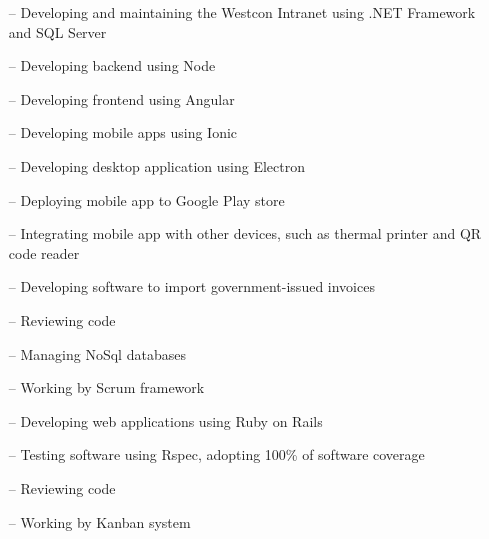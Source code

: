 \documentclass[12pt,a4paper]{altacv}
\begin{document}
\medskip


\begin{itemize}
    \setlength{\itemindent}{1em}
    \item[--] {Developing and maintaining the Westcon Intranet using .NET Framework and SQL Server}
\end{itemize}

\medskip


\begin{itemize}
    \setlength{\itemindent}{1em}
    \item[--] {Developing backend using Node}
    \item[--] {Developing frontend using Angular}
    \item[--] {Developing mobile apps using Ionic}
    \item[--] {Developing desktop application using Electron}
    \item[--] {Deploying mobile app to Google Play store}
    \item[--] {Integrating mobile app with other devices, such as thermal printer and QR code reader}
    \item[--] {Developing software to import government-issued invoices}
    \item[--] {Reviewing code}
    \item[--] {Managing NoSql databases}
    \item[--] {Working by Scrum framework}
\end{itemize}

\medskip


\begin{itemize}
  \setlength{\itemindent}{1em}
  \item[--] {Developing web applications using Ruby on Rails}
  \item[--] {Testing software using Rspec, adopting 100\% of software coverage}
  \item[--] {Reviewing code}
  \item[--] {Working by Kanban system}
\end{itemize}

\medskip
\end{document}
